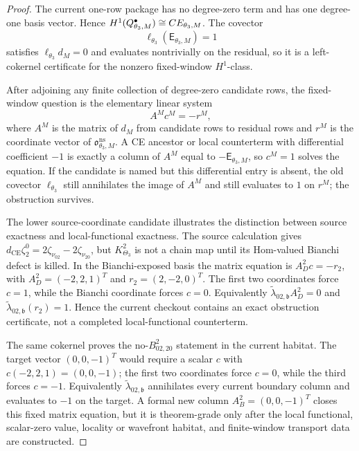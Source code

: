\documentclass[11pt]{memoir}
\begin{document}
\begin{proof}
  The current one-row package has no degree-zero term and has
  one degree-one basis vector.  Hence
  \(H^1(Q^\bullet_{\theta_3,M})\cong
  CE_{\theta_3,M}\).  The covector
  \[
    \ell_{\theta_3}(\mathsf E_{\theta_3,M})=1
  \]
  satisfies \(\ell_{\theta_3}d_M=0\) and evaluates nontrivially on the
  residual, so it is a left-cokernel certificate for the nonzero
  fixed-window \(H^1\)-class.

  After adjoining any finite collection of degree-zero candidate rows,
  the fixed-window question is the elementary linear system
  \[
    A^Mc^M=-r^M,
  \]
  where \(A^M\) is the matrix of \(d_M\) from candidate rows to residual
  rows and \(r^M\) is the coordinate vector of
  \(\mathfrak o^{\mathrm{ns}}_{\theta_3,M}\).  A CE ancestor or local
  counterterm with differential coefficient \(-1\) is exactly a column
  of \(A^M\) equal to \(-\mathsf E_{\theta_3,M}\), so \(c^M=1\) solves
  the equation.  If the candidate is named but this differential entry is
  absent, the old covector \(\ell_{\theta_3}\) still annihilates the
  image of \(A^M\) and still evaluates to \(1\) on \(r^M\); the
  obstruction survives.

  The lower source-coordinate candidate illustrates the distinction
  between source exactness and local-functional exactness.  The source
  calculation gives
  \(d_{\mathrm{CE}}\zeta^0_2=2\zeta_{\nu_{02}}-2\zeta_{\nu_{20}}\), but
  \(K^2_{\Theta_3}\) is not a chain map until its Hom-valued Bianchi
  defect is killed.  In the Bianchi-exposed basis the matrix equation is
  \(A_D^2c=-r_2\), with \(A_D^2=(-2,2,1)^T\) and \(r_2=(2,-2,0)^T\).
  The first two coordinates force \(c=1\), while the Bianchi coordinate
  forces \(c=0\).  Equivalently
  \(\widetilde\lambda_{02,\mathfrak b}A_D^2=0\) and
  \(\widetilde\lambda_{02,\mathfrak b}(r_2)=1\).  Hence the current
  checkout contains an exact obstruction certificate, not a completed
  local-functional counterterm.

  The same cokernel proves the no-\(B^2_{02,20}\) statement in the
  current habitat.  The target vector \((0,0,-1)^T\) would require a
  scalar \(c\) with \(c(-2,2,1)=(0,0,-1)\); the first two coordinates
  force \(c=0\), while the third forces \(c=-1\).  Equivalently
  \(\widetilde\lambda_{02,\mathfrak b}\) annihilates every current
  boundary column and evaluates to \(-1\) on the target.  A formal new
  column \(A_B^2=(0,0,-1)^T\) closes this fixed matrix equation, but it
  is theorem-grade only after the local functional, scalar-zero value,
  locality or wavefront habitat, and finite-window transport data are
  constructed.


\end{proof}
\end{document}
